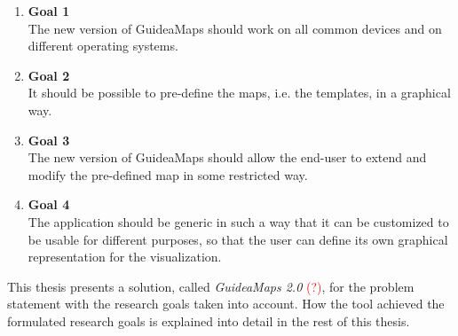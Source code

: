 \begin{enumerate}[label={\textcolor{white}{\arabic*}},ref=\arabic*]
	\item \hspace*{-2.5em}\textbf{Goal 1\label{item:goal:device-os-independent}} \hfill \\
	The new version of GuideaMaps should work on all common devices and on different operating systems.
	
	\item \hspace*{-2.5em}\textbf{Goal 2\label{item:goal:templates}} \hfill \\
	It should be possible to pre-define the maps, i.e. the templates, in a graphical way.
	
	\item \hspace*{-2.5em}\textbf{Goal 3\label{item:goal:extend-modify}} \hfill \\
	The new version of GuideaMaps should allow the end-user to extend and modify the pre-defined map in some restricted way.
	
	\item \hspace*{-2.5em}\textbf{Goal 4\label{item:goal:generic}} \hfill \\
	The application should be generic in such a way that it can be customized to be usable for different purposes, so that the user can define its own graphical representation for the visualization.
\end{enumerate}

This thesis presents a solution, called \textit{GuideaMaps 2.0} \textcolor{red}{(?)}, for the problem statement with the research goals taken into account. How the tool achieved the formulated research goals is explained into detail in the rest of this thesis.